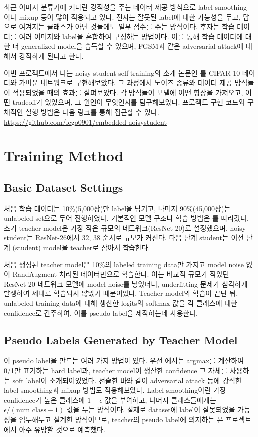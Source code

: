 \documentclass[a4paper, 10pt]{article}
\begin{document}
최근 이미지 분류기에 커다란 강직성을 주는 데이터 제공 방식으로 label smoothing
\cite{szegedy2015rethinking} 이나 mixup \cite{zhang2018mixup} 등이 많이 적용되고
있다. 전자는 잘못된 label에 대한 가능성을 두고, 답으로 여겨지는 클래스가 아닌
것들에도 일부 점수를 주는 방식이다. 후자는 학습 데이터를 여러 이미지와 label을
혼합하여 구성하는 방법이다. 이를 통해 학습 데이터에 대한 더 generalized model을
습득할 수 있으며, FGSM과 같은 adversarial attack에 대해서 강직하게 된다고 한다.
\cite{zhang2018mixup}

이번 프로젝트에서 나는 noisy student self-training의 소개 논문인
\cite{xie2020selftraining}를 CIFAR-10 데이터와 가벼운 네트워크로 구현해보았다.
그 과정에서 노이즈 종류와 데이터 제공 방식들이 적용되었을 때의 효과를
살펴보았다. 각 방식들이 모델에 어떤 향상을 가져오고, 어떤 tradeoff가 있었으며,
그 원인이 무엇인지를 탐구해보았다. 프로젝트 구현 코드와 구체적인 실행 방법은
다음 링크를 통해 접근할 수 있다.\\
\url{https://github.com/lego0901/embedded-noisystudent}


\section{Training Method}
\subsection{Basic Dataset Settings}
처음 학습 데이터는 10\%(5,000장)만 label을 남기고, 나머지 90\%(45,000장)는
unlabeled set으로 두어 진행하였다. 기본적인 모델 구조나 학습 방법은
\cite{xie2020selftraining}를 따라갔다. 초기 teacher model은 가장 작은 규모의
네트워크(ResNet-20)로 설정했으며, noisy student는 ResNet-26에서 32, 38 순서로
규모가 커진다. 다음 단계 student는 이전 단계 (student) model을 teacher로 삼아서
학습한다.

처음 생성된 teacher model은 10\%의 labeled training data만 가지고 model noise
없이 RandAugment 처리된 데이터만으로 학습한다. 이는 비교적 규모가 작았던
ResNet-20 네트워크 모델에 model noise를 넣었더니, underfitting 문제가 심각하게
발생하여 제대로 학습되지 않았기 떄문이었다. Teacher model의 학습이 끝난 뒤,
unlabeled training data에 대해 생산한 logits의 softmax 값을 각 클래스에 대한
confidence로 간주하여, 이를 pseudo label을 제작하는데 사용한다.

\subsection{Pseudo Labels Generated by Teacher Model}
이 pseudo label을 만드는 여러 가지 방법이 있다. 우선
\cite{xie2020selftraining}에서는 argmax를 계산하여 0/1만 표기하는 hard label과,
teacher model이 생산한 confidence 그 자체를 사용하는 soft label이
소개되어있었다. 선술한 바와 같이 adversarial attack 등에 강직한 label
smoothing과 mixup 방법도 적용해보았다. Label smoothing이란 가장 confidence가
높은 클래스에 $1 - \epsilon$ 값을 부여하고, 나머지 클래스들에게는 $\epsilon /
(\text{num\_class} - 1)$ 값을 두는 방식이다. \cite{szegedy2015rethinking} 실제로
dataset에 label이 잘못되었을 가능성을 염두해두고 설계한 방식이므로, teacher의
pseudo label에 의지하는 본 프로젝트에서 아주 유망할 것으로 예측했다.
\end{document}
